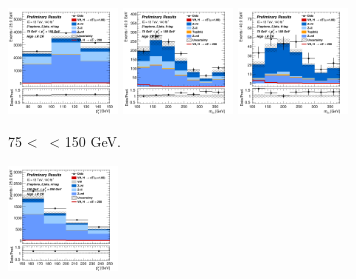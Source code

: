 \begin{figure}[h!]
    \centering
    \begin{subfigure}[b]{\textwidth}
        \centering
        \includegraphics[width=0.32\textwidth]{Images/VH/Own_fit/prefit_VHcc/Region_distpTV_BMax150_BMin75_DCRHigh_J2_TTypent_T1_L2_Y6051_Prefit.png}
        \includegraphics[width=0.32\textwidth]{Images/VH/Own_fit/prefit_VHcc/Region_distmBB_BMax150_BMin75_DCRHigh_J2_TTypelt_T2_L2_Y6051_Prefit.png}
        \includegraphics[width=0.32\textwidth]{Images/VH/Own_fit/prefit_VHcc/Region_distmBB_BMax150_BMin75_DCRHigh_J2_TTypett_T2_L2_Y6051_Prefit.png}
        \caption{75 < \ptv\ < 150 GeV.}
        \label{fig:plots_VHcc_2L_75_CRH_2J}
    \end{subfigure}
    \begin{subfigure}[b]{\textwidth}
        \centering
        \includegraphics[width=0.32\textwidth]{Images/VH/Own_fit/prefit_VHcc/Region_distpTV_BMax250_BMin150_DCRHigh_J2_TTypent_T1_L2_Y6051_Prefit.png}

\end{subfigure}
\end{figure}
